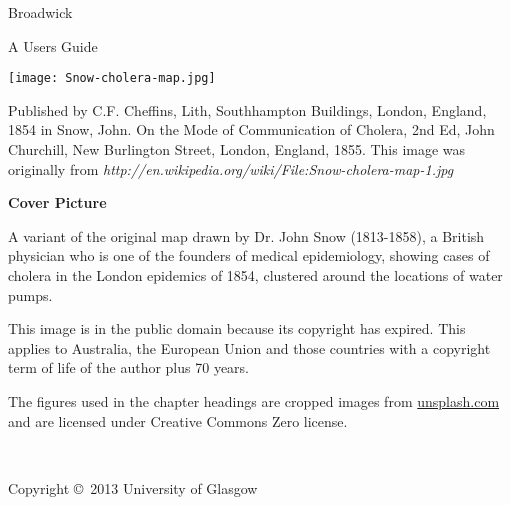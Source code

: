 \documentclass[11pt,fleqn]{book} %
\begin{document}

\begingroup
\thispagestyle{empty}
\centering
\vspace*{13cm}
\par\normalfont\fontsize{35}{35}\sffamily\selectfont
Broadwick\par %
\vspace*{1cm}
{\Huge A Users Guide}\par %
\endgroup


\newpage
\thispagestyle{empty}

\begin{center}
\texttt{[image: Snow-cholera-map.jpg]}
\end{center}

Published by C.F. Cheffins, Lith, Southhampton Buildings, London, England, 1854 in Snow, John. On the Mode of Communication of Cholera, 2nd Ed, John Churchill, New Burlington Street, London, England, 1855.
This image was originally from \emph{http://en.wikipedia.org/wiki/File:Snow-cholera-map-1.jpg}

\textbf{Cover Picture}

A variant of the original map drawn by Dr. John Snow (1813-1858), a British physician who is one of the founders of medical epidemiology, showing cases of cholera in the London epidemics of 1854, clustered around the locations of water pumps.

This image is in the public domain because its copyright has expired. This applies to Australia, the European Union and those countries with a copyright term of life of the author plus 70 years.

The figures used in the chapter headings are cropped images from \url{unsplash.com} and are licensed under Creative Commons Zero license.

~\vfill

\noindent Copyright \copyright\ 2013 University of Glasgow\\ %
\end{document}
